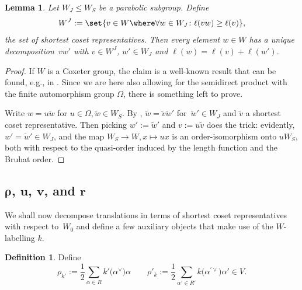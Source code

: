 \documentclass[pdftex]{sigma}
\newtheorem{Lemma}[Theorem]{Lemma}
\theoremstyle{definition}
\newtheorem{Definition}[Theorem]{Definition}
\numberwithin{equation}{section}
\begin{document}
\begin{Lemma}\label{sec:lem-existence-shortest-coset-dec}
 Let $W_J\le W_S$ be a parabolic subgroup. Define
 \[
 W^J := \set{v\in W\where\forall w\in W_J\colon \ell(vw)\ge\ell(v)},
 \]
 the set of shortest coset representatives. Then every element
 $w\in W$ has a unique decomposition~$vw'$ with $v\in W^J$, $w'\in W_J$ and $\ell(w)=\ell(v)+\ell(w')$.
\end{Lemma}
\begin{proof}
 If $W$ is a Coxeter group, the claim is a well-known result that
 can be found, e.g., in \cite[Section~5.12, Proposition~1.12]{humphreysRefl}. Since we are here also allowing for the semidirect
 product with the finite automorphism group $\Omega$, there is something left to prove.

 Write $w=u\tilde{w}$ for $u\in\Omega,\tilde{w}\in W_S$. By \cite[Section~5.12, Proposition~1.12]{humphreysRefl}, $\tilde{w}=\tilde{v}\tilde{w}'$
 for~${\tilde{w}'\in W_J}$ and $\tilde{v}$ a shortest coset representative. Then
 picking $w':= \tilde{w}'$ and $v:=u\tilde{v}$ does the trick: evidently,
 $w'=\tilde{w}'\in W_J$, and the map $W_S\to W, x\mapsto ux$ is an order-isomorphism
 onto $uW_S$, both with respect to the quasi-order induced by the length function
 and the Bruhat order.
\end{proof}

\subsection[rho, u, v, and r]{$\boldsymbol{\rho}$, $\boldsymbol{u}$, $\boldsymbol{v}$, and $\boldsymbol{r}$}
We shall now decompose translations in terms of shortest coset
representatives with respect to~$W_0$ and define a few auxiliary objects
that make use of the $W$-labelling $k$.

\begin{Definition}
 Define
 \[
 \rho_{k'} := \frac{1}{2}\sum_{\alpha\in R} k'\bigl(\alpha^\vee\bigr)\alpha
 \qquad \rho'_k := \frac{1}{2}\sum_{\alpha'\in R'} k\bigl(\alpha^{\prime\vee}\bigr)\alpha' \in V.
 \]
\end{Definition}
\end{document}
